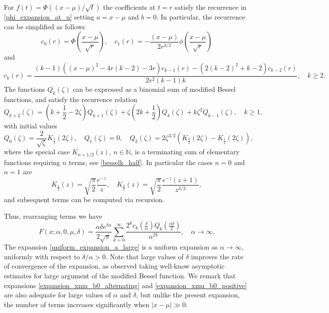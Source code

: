 \documentclass[10pt,a4paper,oneside]{article}
\numberwithin{equation}{section}
\begin{document}
For $f(t) = \Phi((x-\mu)/\sqrt{t})$ the coefficients at $t=r$ satisfy the recurrence in \eqref{phi_expansion_at_u} setting $a=x-\mu$ and $b=0$. In particular, the recurrence can be simplified as follows
\begin{equation}
c_0(r) = \Phi\left(\frac{x-\mu}{\sqrt{r}}\right), \quad c_1(r) = -\frac{(x-\mu)}{2 r^{3/2}} \phi\left(\frac{x-\mu}{\sqrt{r}}\right)
\end{equation}
and
\begin{equation}
c_k(r) = \frac{(k - 1) ((x-\mu)^2 - 4 r(k-2) - 3r) c_{k-1}(r) - (2(k-2)^2 + k-2) c_{k-2}(r)}{2r^2 (k-1) k}, \quad k\ge 2.
\end{equation}
The functions $Q_k(\zeta)$ can be expressed as a binomial sum of modified Bessel functions, and satisfy the recurrence relation \cite[\S 27.3.28]{Temme2015}
\begin{equation}
Q_{k+2}(\zeta) = \left(k + \frac{1}{2} -2\zeta\right) Q_{k+1}(\zeta) + \zeta\left(2k + \frac{1}{2}\right)Q_k(\zeta) + k\zeta^2 Q_{k-1}(\zeta), \quad k\ge 1,
\end{equation}
with initial values
\begin{equation}
Q_0(\zeta) = \frac{2}{\sqrt{\zeta}} K_{\frac{1}{2}}(2 \zeta), \quad Q_1(\zeta) = 0, \quad Q_2(\zeta) = 2 \zeta^{3/2} \left(K_{\frac{3}{2}}(2\zeta) - K_{\frac{1}{2}}(2 \zeta)\right),
\end{equation}
where the special case $K_{n+1/2}(z)$, $n \in \mathbb{N}$, is a terminating sum of elementary functions requiring $n$ terms, see \eqref{besselk_half}. In particular the cases $n=0$ and $n=1$ are
\begin{equation*}
K_{\frac{1}{2}}(z) = \sqrt{\frac{\pi}{2}}\frac{e^{-z}}{z}, \quad K_{\frac{3}{2}}(z) = \sqrt{\frac{\pi}{2}}\frac{e^{-z} (z+1)}{z^{3/2}},
\end{equation*}
and subsequent terms can be computed via recursion.

Thus, rearranging terms we have
\begin{equation}\label{uniform_expansion_a_large}
F(x; \alpha, 0, \mu, \delta) = \frac{\alpha \delta e^{\delta \alpha}}{2 \sqrt{\pi}} \sum_{k=0}^{\infty} \frac{2^k c_k\left(\frac{\delta}{\alpha}\right) Q_k\left(\frac{\alpha \delta}{2}\right)}{\alpha^{2k}}, \quad \alpha \to \infty.
\end{equation}
The expansion \eqref{uniform_expansion_a_large} is a uniform expansion as $\alpha \to \infty$, uniformly with respect to $\delta / \alpha > 0$. Note that large values of $\delta$ improves the rate of convergence of the expansion, as observed taking well-know asymptotic estimates for large argument of the modified Bessel function. We remark that expansions \eqref{expansion_xmu_b0_alternating} and \eqref{expansion_xmu_b0_positive} are also adequate for large values of $\alpha$ and $\delta$, but unlike the present expansion, the number of terms increases significantly when $|x-\mu| \gg 0$.
\end{document}
